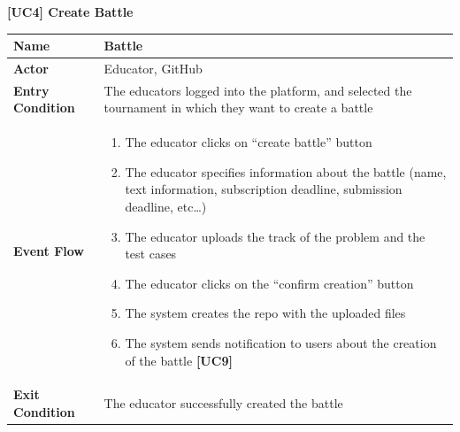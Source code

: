 \documentclass{article}
\begin{document}
\begin{table}
 \renewcommand{\arraystretch}{1.5}
    \centering
    \raggedright\textbf{[UC4] Create Battle}
    \begin{tabular}{|l|p{10cm}|}
        \hline
        \textbf{Name} & Battle\\
        \hline
        \textbf{Actor} & Educator, GitHub \\
        \hline
        \textbf{Entry Condition} & The educators logged into the platform, and selected the tournament in which they want to create a battle \\
        \hline
        \textbf{Event Flow} & 
        \begin{enumerate}[align=left, topsep=0pt, partopsep=0pt]
            \item The educator clicks on “create battle” button
            \item The educator specifies information about the battle (name, text information, subscription deadline, submission deadline, etc…)
            \item The educator uploads the track of the problem and the test cases 
            \item The educator clicks on the “confirm creation” button
            \item The system creates the repo with the uploaded files
            \item The system sends notification to users about the creation of the battle \textbf{[UC9]}
        \end{enumerate} \\
        \hline
        \textbf{Exit Condition} & The educator successfully created the battle  \\
        \hline
    \end{tabular}
\end{table}
\end{document}
